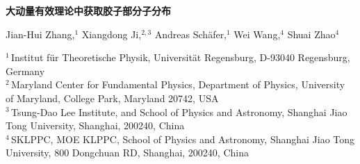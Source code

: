 \documentclass[11pt]{ctexart}
\begin{document}
\begin{center}
  {\Large\bfseries 大动量有效理论中获取胶子部分子分布\par}
  \vspace{1.4em}
  {\normalsize
   Jian-Hui Zhang,$^{1}$\;
   Xiangdong Ji,$^{2,3}$\;
   Andreas Sch\"afer,$^{1}$\;
   Wei Wang,$^{4}$\;
   Shuai Zhao$^{4}$\par}
  \vspace{0.9em}
  {\small
   $^{1}$\,Institut f\"ur Theoretische Physik, Universit\"at Regensburg, D-93040 Regensburg, Germany\\[2pt]
   $^{2}$\,Maryland Center for Fundamental Physics, Department of Physics, University of Maryland,
   College Park, Maryland 20742, USA\\[2pt]
   $^{3}$\,Tsung-Dao Lee Institute, and School of Physics and Astronomy,
   Shanghai Jiao Tong University, Shanghai, 200240, China\\[2pt]
   $^{4}$\,SKLPPC, MOE KLPPC, School of Physics and Astronomy, Shanghai Jiao Tong University,
   800 Dongchuan RD, Shanghai, 200240, China\par}
\end{center}

\vspace{0.4em}

\begin{abstract}
利用大动量有效理论（large momentum effective theory, LaMET），质子内的胶子部分子分布函数（PDFs）可以直接在欧几里得格点上计算。为实现这一目标，必须找到这样的重正化胶子准PDF：其中的幂次发散与算符混合已被彻底理解。对于非极化分布，我们确定出四种可以在格点上乘法重正化的独立准PDF关联函数。类似地，螺旋度分布可以由三个独立的可乘法重正化的准PDF导出。我们为这些重正化的准PDF给出了一个 LaMET 因子化公式，由此可以提取胶子 PDFs。
\end{abstract}









\end{document}
